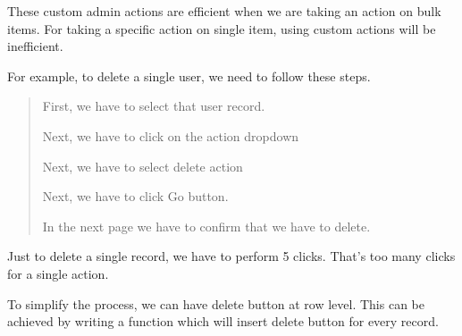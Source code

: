 \documentclass[letterpaper,11pt,english]{sphinxmanual}
\begin{document}

These custom admin actions are efficient when we are taking an action on bulk items. For taking a specific action on single item, using custom actions will be inefficient.

For example, to delete a single user, we need to follow these steps.
\begin{quote}

First, we have to select that user record.

Next, we have to click on the action dropdown

Next, we have to select delete action

Next, we have to click Go button.

In the next page we have to confirm that we have to delete.
\end{quote}

Just to delete a single record, we have to perform 5 clicks. That’s too many clicks for a single action.

To simplify the process, we can have delete button at row level. This can be achieved by writing a function which will insert delete button for every record.
\end{document}
